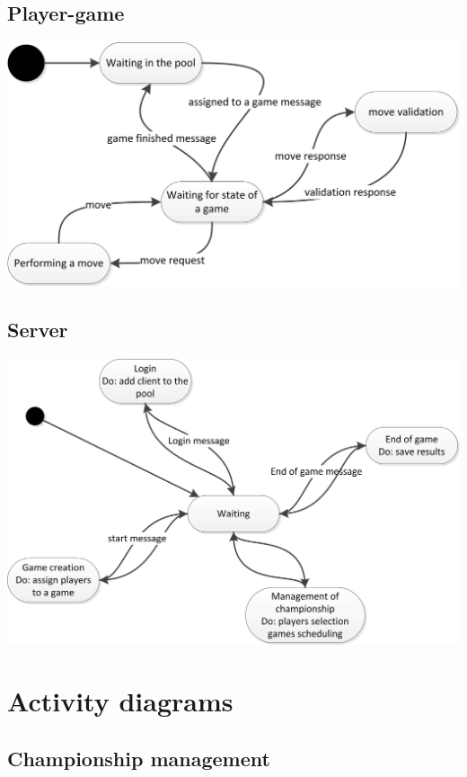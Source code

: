 \documentclass{article}
\begin{document}
\subsection{Player-game}

\includegraphics[scale=1.10]{UGS_states_player-game.jpg}


\pagebreak[4]


\subsection{Server}

\includegraphics[scale=1.10]{UGS_states_server.jpg}

\section{Activity diagrams}

\subsection{Championship management}
\end{document}
